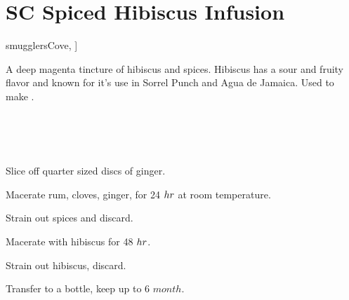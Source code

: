 \section[SC Hibiscus Infusion]{
    SC Spiced Hibiscus Infusion
}\label{hibiscus_infusion}

\begin{recipestats}[
        servings=16~\fluidounce,
        preptime=5~\minute,
        inactivetime=72~\hour,
        original=\citeauthor{smugglersCove}~\cite[p.~331]{smugglersCove},
    ]
\end{recipestats}

\begin{recipeabstract}
    A deep magenta tincture of hibiscus and spices.
    Hibiscus has a sour and fruity flavor and known for it's use in Sorrel
    Punch and Agua de Jamaica.
    Used to make .
\end{recipeabstract}

\begin{ingredientcolumns}[1]
    \begin{ingredientblock}
        \\
        \\
        \\
    \end{ingredientblock}
\end{ingredientcolumns}

\begin{preparation}
\item Slice off quarter sized discs of ginger.
\item Macerate rum, cloves, ginger, for 24 $\hour$ at room temperature.
\item Strain out spices and discard.
\item Macerate with hibiscus for 48 $\hour$.
\item Strain out hibiscus, discard.
\item Transfer to a bottle, keep up to 6 $month$.
\end{preparation}

\recipeend%

